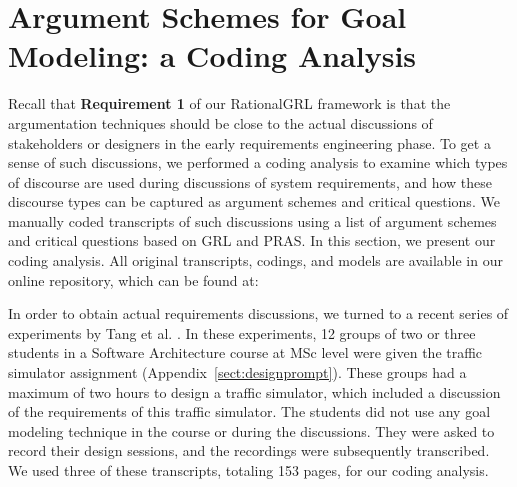 \section{Argument Schemes for Goal Modeling: a Coding Analysis}
\label{sect:gmas}

Recall that \textbf{Requirement 1} of our RationalGRL framework is that the argumentation techniques should be close to the actual discussions of stakeholders or designers in the early requirements engineering phase. To get a sense of such discussions, we performed a coding analysis to examine which types of discourse are used during discussions of system requirements, and how these discourse types can be captured as argument schemes and critical questions. We manually coded transcripts of such discussions using a list of argument schemes and critical questions based on GRL and PRAS. In this section, we present our coding analysis. All original transcripts, codings, and models are available in our online repository, which can be found at:  
 
\begin{quote}
\rationalgrlurl{}
\end{quote}

In order to obtain actual requirements discussions, we turned to a recent series of experiments by Tang et al. \cite{TangEtal2018}. In these experiments, 12 groups of two or three students in a Software Architecture course at MSc level were given the traffic simulator assignment (Appendix~\ref{sect:designprompt}). These groups had a maximum of two hours to design a traffic simulator, which included a discussion of the requirements of this traffic simulator. The students did not use any goal modeling technique in the course or during the discussions. They were asked to record their design sessions, and the recordings were subsequently transcribed. We used three of these transcripts, totaling 153 pages, for our coding analysis. 


